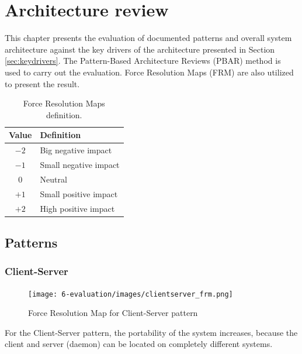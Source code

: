 
\clearpage
\chapter{Architecture review}
\label{ch:archreview}
This chapter presents the evaluation of documented patterns and overall system architecture
against the key drivers of the architecture presented in Section \ref{sec:keydrivers}. The  Pattern-Based Architecture Reviews (PBAR) \cite{pbar} method is used to carry out the
evaluation. Force Resolution Maps (FRM) are also utilized to present the result.

\begin{table}[H]
\centering
\caption{Force Resolution Maps definition.}
\label{tab:frm-table}
\begin{tabular}{cl}
\textbf{Value} & \textbf{Definition} \\ \toprule
            $-2$   & Big negative impact \\
            $-1$   & Small negative impact \\
            $0$    & Neutral \\
            $+1$   & Small positive impact \\
            $+2$   & High positive impact 
\end{tabular}
\end{table}

\section{Patterns}

\subsection{Client-Server}
\begin{figure}[H]
\centering
\texttt{[image: 6-evaluation/images/clientserver\_frm.png]}
\caption{Force Resolution Map for Client-Server pattern}
\label{fig:clientserver-frm}
\end{figure}
For the Client-Server pattern, the portability of the system increases, because the client and server (daemon) can be located on completely different systems.

